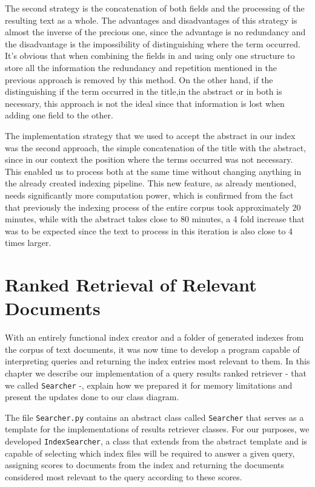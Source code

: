 \documentclass[12pt]{article}
\begin{document}
The second strategy is the concatenation of both fields and the processing of the resulting text as a whole. The advantages and disadvantages of this strategy is almost the inverse of the precious one, since the advantage is no redundancy and the disadvantage is the impossibility of distinguishing where the term occurred. It's obvious that when combining the fields in and using only one structure to store all the information the redundancy and repetition mentioned in the previous approach is removed by this method. On the other hand, if the distinguishing if the term occurred in the title,in the abstract or in both is necessary, this approach is not the ideal since that information is lost when adding one field to the other.

The implementation strategy that we used to accept the abstract in our index was the second approach, the simple concatenation of the title with the abstract, since in our context the position where the terms occurred was not necessary. This enabled us to process both at the same time without changing anything in the already created indexing pipeline. This new feature, as already mentioned, needs significantly more computation power, which is confirmed from the fact that previously the indexing process of the entire corpus took approximately 20 minutes, while with the abstract takes close to 80 minutes, a 4 fold increase that was to be expected since the text to process in this iteration is also close to 4 times larger.

\section{Ranked Retrieval of Relevant Documents}
With an entirely functional index creator and a folder of generated indexes from
the corpus of text documents, it was now time to develop a program capable of
interpreting queries and returning the index entries most relevant to them.
In this chapter we describe our implementation of a query results ranked retriever
- that we called \texttt{Searcher} -, explain how we prepared it for memory 
limitations and present the updates done to our class diagram.

The file \texttt{Searcher.py} contains an abstract class called \texttt{Searcher}
that serves as a template for the implementations of results retriever classes.
For our purposes, we developed \texttt{IndexSearcher}, a class that extends from
the abstract template and is capable of selecting which index files will be 
required to answer a given query, assigning scores to documents from the index
and returning the documents considered most relevant to the query according to 
these scores.
\end{document}
